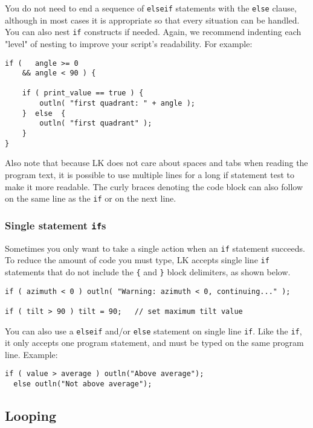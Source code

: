 \documentclass{article}
\begin{document}
You do not need to end a sequence of \texttt{elseif} statements with the \texttt{else} clause, although in most cases it is appropriate so that every situation can be handled.  You can also nest \texttt{if} constructs if needed.  Again, we recommend indenting each "level" of nesting to improve your script's readability.  For example:

\begin{verbatim}
if (   angle >= 0 
    && angle < 90 ) {
    
    if ( print_value == true ) {
        outln( "first quadrant: " + angle );
    }  else  {
        outln( "first quadrant" );
    }
}
\end{verbatim}

Also note that because LK does not care about spaces and tabs when reading the program text, it is possible to use multiple lines for a long if statement test to make it more readable.  The curly braces denoting the code block can also follow on the same line as the \texttt{if} or on the next line.

\subsubsection{Single statement \texttt{if}s}
Sometimes you only want to take a single action when an \texttt{if} statement succeeds.  To reduce the amount of code you must type, LK accepts single line \texttt{if} statements that do not include the \texttt{\{} and \texttt{\}} block delimiters, as shown below.

\begin{verbatim}
if ( azimuth < 0 ) outln( "Warning: azimuth < 0, continuing..." );

if ( tilt > 90 ) tilt = 90;   // set maximum tilt value
\end{verbatim}

You can also use a \texttt{elseif} and/or \texttt{else} statement on single line \texttt{if}.  Like the \texttt{if}, it only accepts one program statement, and must be typed on the same program line.  Example:

\begin{verbatim}
if ( value > average ) outln("Above average");
  else outln("Not above average");
\end{verbatim}

\subsection{Looping}
\end{document}
